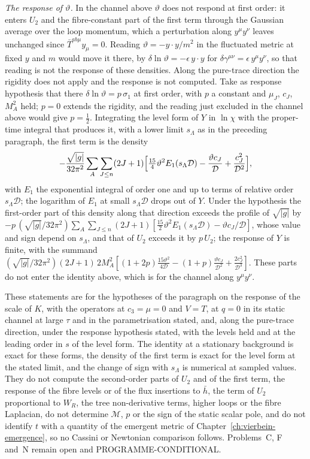 \emph{The response of \(\vartheta\).} In the channel above \(\vartheta\) does not respond at first order: it enters \(U_2\) and the fibre-constant part of the first term through the Gaussian average over the loop momentum, which a perturbation along \(y^\mu y^\nu\) leaves unchanged since \(\bar T^{ab\mu}y_\mu=0\). Reading \(\vartheta=-y\cdot y/m^2\) in the fluctuated metric at fixed \(y\) and \(m\) would move it there, by \(\delta\ln\vartheta=-\epsilon\,y\cdot y\) for \(\delta\gamma^{\mu\nu}=\epsilon\,y^\mu y^\nu\), so that reading is not the response of these densities. Along the pure-trace direction the rigidity does not apply and the response is not computed. Take as response hypothesis that there \(\delta\ln\vartheta=p\,\sigma_1\) at first order, with \(p\) a constant and \(\mu_J\), \(c_J\), \(M_A^2\) held; \(p=0\) extends the rigidity, and the reading just excluded in the channel above would give \(p=\tfrac12\). Integrating the level form of \(Y\) in \(\ln\chi\) with the proper-time integral that produces it, with a lower limit \(s_\Lambda\) as in the preceding paragraph, the first term is the density
\[
-\frac{\sqrt{|g|}}{32\pi^2}\sum_A\sum_{J\le n}(2J+1)\Bigl[\tfrac{15}{4}\vartheta^2E_1(s_\Lambda\mathcal D)-\frac{\vartheta c_J}{\mathcal D}+\frac{c_J^2}{\mathcal D^2}\Bigr],
\]
with \(E_1\) the exponential integral of order one and up to terms of relative order \(s_\Lambda\mathcal D\); the logarithm of \(E_1\) at small \(s_\Lambda\mathcal D\) drops out of \(Y\). Under the hypothesis the first-order part of this density along that direction exceeds the profile of \(\sqrt{|g|}\) by \(-p\,(\sqrt{|g|}/32\pi^2)\sum_A\sum_{J\le n}(2J+1)[\tfrac{15}{2}\vartheta^2E_1(s_\Lambda\mathcal D)-\vartheta c_J/\mathcal D]\), whose value and sign depend on \(s_\Lambda\), and that of \(U_2\) exceeds it by \(p\,U_2\); the response of \(Y\) is finite, with the summand \((\sqrt{|g|}/32\pi^2)(2J+1)\,2M_A^2[(1+2p)\tfrac{15\vartheta^2}{4\mathcal D}-(1+p)\tfrac{\vartheta c_J}{\mathcal D^2}+\tfrac{2c_J^2}{\mathcal D^3}]\). These parts do not enter the identity above, which is for the channel along \(y^\mu y^\nu\).

These statements are for the hypotheses of the paragraph on the response of the scale of \(K\), with the operators at \(c_3=\mu=0\) and \(V=T\), at \(q=0\) in its static channel at large \(\tau\) and in the parametrisation stated, and, along the pure-trace direction, under the response hypothesis stated, with the levels held and at the leading order in \(s\) of the level form. The identity at a stationary background is exact for these forms, the density of the first term is exact for the level form at the stated limit, and the change of sign with \(s_\Lambda\) is numerical at sampled values. They do not compute the second-order parts of \(U_2\) and of the first term, the response of the fibre levels or of the flux insertions to \(\bar h\), the term of \(U_2\) proportional to \(W_R\), the tree non-derivative terms, higher loops or the fibre Laplacian, do not determine \(\mathcal M\), \(p\) or the sign of the static scalar pole, and do not identify \(t\) with a quantity of the emergent metric of Chapter~\ref{ch:vierbein-emergence}, so no Cassini or Newtonian comparison follows. Problems~C, F and~N remain open and PROGRAMME-CONDITIONAL.